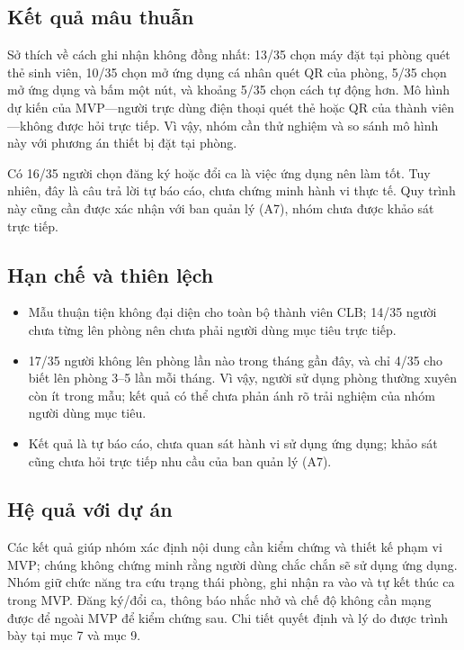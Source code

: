 \subsection{Kết quả mâu thuẫn}
Sở thích về cách ghi nhận không đồng nhất: 13/35 chọn máy đặt tại phòng quét thẻ sinh viên, 10/35 chọn mở ứng dụng cá nhân quét QR của phòng, 5/35 chọn mở ứng dụng và bấm một nút, và khoảng 5/35 chọn cách tự động hơn. Mô hình dự kiến của MVP—người trực dùng điện thoại quét thẻ hoặc QR của thành viên—không được hỏi trực tiếp. Vì vậy, nhóm cần thử nghiệm và so sánh mô hình này với phương án thiết bị đặt tại phòng.

Có 16/35 người chọn đăng ký hoặc đổi ca là việc ứng dụng nên làm tốt. Tuy nhiên, đây là câu trả lời tự báo cáo, chưa chứng minh hành vi thực tế. Quy trình này cũng cần được xác nhận với ban quản lý (A7), nhóm chưa được khảo sát trực tiếp.

\subsection{Hạn chế và thiên lệch}
\begin{itemize}[nosep]
    \item Mẫu thuận tiện không đại diện cho toàn bộ thành viên CLB; 14/35 người chưa từng lên phòng nên chưa phải người dùng mục tiêu trực tiếp.
    \item 17/35 người không lên phòng lần nào trong tháng gần đây, và chỉ 4/35 cho biết lên phòng 3--5 lần mỗi tháng. Vì vậy, người sử dụng phòng thường xuyên còn ít trong mẫu; kết quả có thể chưa phản ánh rõ trải nghiệm của nhóm người dùng mục tiêu.
    \item Kết quả là tự báo cáo, chưa quan sát hành vi sử dụng ứng dụng; khảo sát cũng chưa hỏi trực tiếp nhu cầu của ban quản lý (A7).
\end{itemize}

\subsection{Hệ quả với dự án}
Các kết quả giúp nhóm xác định nội dung cần kiểm chứng và thiết kế phạm vi MVP; chúng không chứng minh rằng người dùng chắc chắn sẽ sử dụng ứng dụng. Nhóm giữ chức năng tra cứu trạng thái phòng, ghi nhận ra vào và tự kết thúc ca trong MVP. Đăng ký/đổi ca, thông báo nhắc nhở và chế độ không cần mạng được để ngoài MVP để kiểm chứng sau. Chi tiết quyết định và lý do được trình bày tại mục 7 và mục 9.